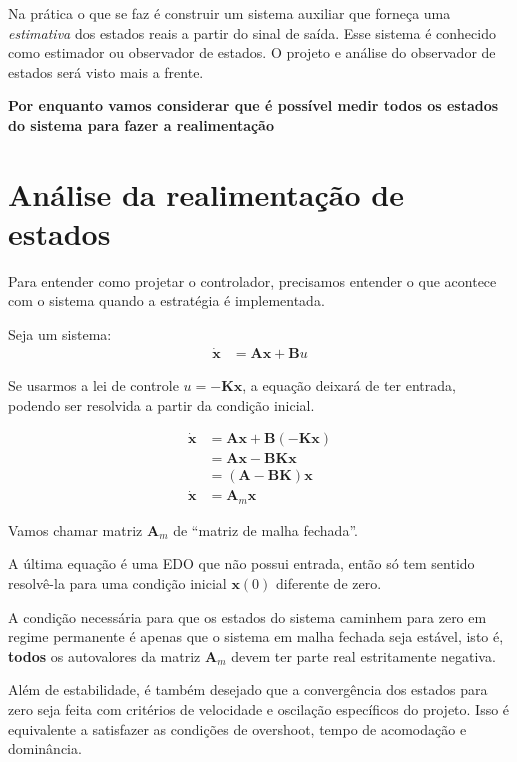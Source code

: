 \documentclass[
]{book}
\begin{document}
Na prática o que se faz é construir um sistema auxiliar que
forneça uma \emph{estimativa} dos estados reais a partir do sinal de saída.
Esse sistema é conhecido como estimador ou observador de estados. O projeto e análise do observador de estados será visto mais a frente.

\textbf{Por enquanto vamos considerar que é possível medir todos os estados do
sistema para fazer a realimentação}

\hypertarget{anuxe1lise-da-realimentauxe7uxe3o-de-estados}{%
\section{Análise da realimentação de estados}\label{anuxe1lise-da-realimentauxe7uxe3o-de-estados}}

Para entender como projetar o controlador, precisamos entender o que acontece com o sistema quando a estratégia é implementada.

Seja um sistema:
\begin{align*}
    \mathbf{\dot{x}} &= \mathbf{Ax+B}u
\end{align*}

Se usarmos a lei de controle \(u = -\mathbf{Kx}\), a equação deixará de
ter entrada, podendo ser resolvida a partir da condição inicial.

\begin{align*}
    \mathbf{\dot{x}} &= \mathbf{Ax+B(-Kx)}\\
    &= \mathbf{Ax-BKx}\\
    &= \mathbf{(A-BK)x}\\
    \mathbf{\dot{x}} &= \mathbf{A}_m \mathbf{x}
\end{align*}

Vamos chamar matriz \(\mathbf{A}_m\) de ``matriz de malha fechada''.

A última equação é uma EDO que não possui entrada, então só tem sentido
resolvê-la para uma condição inicial \(\mathbf{x}(0)\) diferente de zero.

A condição necessária para que os estados do sistema caminhem para zero
em regime permanente é apenas que o sistema em malha fechada seja
estável, isto é, \textbf{todos} os autovalores da matriz \(\mathbf{A}_m\) devem
ter parte real estritamente negativa.

Além de estabilidade, é também desejado que a convergência dos estados
para zero seja feita com critérios de velocidade e oscilação específicos
do projeto. Isso é equivalente a satisfazer as condições de overshoot,
tempo de acomodação e dominância.
\end{document}
